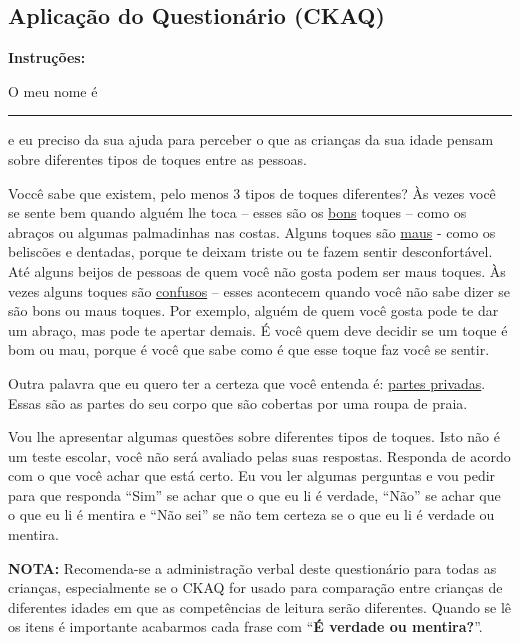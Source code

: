 

\begin{apendicesenv}


\chapter{Aplicação do Questionário (CKAQ)}\label{chap:teste}

\noindent
\textbf{Instruções:}

O meu nome é \rule{3.0cm}{0.15mm} e eu preciso da sua ajuda para perceber o que as crianças da sua idade pensam sobre diferentes tipos de toques entre as pessoas. 

Voccê sabe que existem, pelo menos 3 tipos de toques diferentes? Às vezes você se sente bem quando alguém lhe toca – esses são os \underline{bons} toques – como os abraços ou algumas palmadinhas nas costas. Alguns toques são \underline{maus} - como os beliscões e dentadas, porque te deixam triste ou te fazem sentir desconfortável. Até alguns beijos de pessoas de quem  você não gosta podem ser maus toques. Às vezes alguns toques são \underline{confusos} – esses acontecem quando você não sabe dizer se são bons ou maus toques. Por exemplo, alguém de quem você gosta pode te dar um abraço, mas pode te apertar demais. É você quem deve decidir se um toque é bom ou mau, porque é você que sabe como é que esse toque faz você se sentir.

Outra palavra que eu quero ter a certeza que você entenda é: \underline{partes privadas}. Essas são as partes do seu corpo que são cobertas por uma roupa de praia. 

Vou lhe apresentar algumas questões sobre diferentes tipos de toques. Isto não é um teste escolar, você não será avaliado pelas suas respostas. Responda de acordo com o que você achar que está certo. Eu vou ler algumas perguntas e vou pedir para que responda “Sim” se achar que o que eu li é verdade, “Não” se achar que o que eu li é mentira e “Não sei” se não tem certeza se o que eu li é verdade ou mentira. 

\vspace{1.0cm}

\noindent
\textbf{NOTA:} Recomenda-se a administração verbal deste questionário para todas as crianças, especialmente se o CKAQ for usado para comparação entre crianças de diferentes idades em que as competências de leitura serão diferentes. Quando se lê os itens é importante acabarmos cada frase com ``\textbf{É verdade ou mentira?}''.


\end{apendicesenv}
